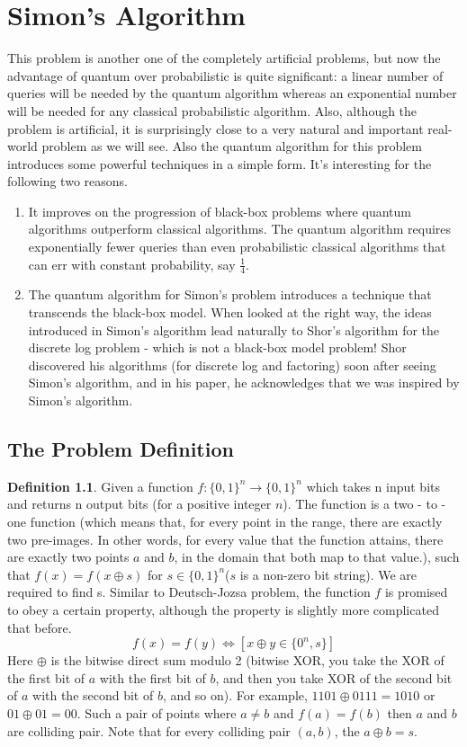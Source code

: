 \documentclass[12pt, oneside]{book}
\theoremstyle{definition}
\newtheorem{definition}{Definition}[section]
\theoremstyle{definition}
\theoremstyle{remark}
\begin{document}
\chapter{Simon's Algorithm}
This problem is another one of the completely artificial problems, but now the advantage of quantum over probabilistic is quite significant: a linear  number of queries will be needed by the quantum algorithm whereas an exponential number will be needed for any classical probabilistic algorithm. Also, although the problem is artificial, it is surprisingly close to a very natural and important real-world problem as we will see. Also the quantum algorithm for this problem introduces some powerful techniques in a simple form. It's interesting for the following two reasons.
\begin{enumerate}
    \item It improves on the progression of black-box problems where quantum algorithms outperform classical algorithms. The quantum algorithm requires exponentially fewer queries than even probabilistic classical algorithms that can err with constant probability, say $\frac{1}{4}$.
    \item The quantum algorithm for Simon's problem introduces a technique that transcends the black-box model. When looked at the right way, the ideas introduced in Simon's algorithm lead naturally to Shor's algorithm for the discrete log problem - which is not a black-box model problem! Shor discovered his algorithms (for discrete log and factoring) soon after seeing Simon's algorithm, and in his paper, he acknowledges that we was inspired by Simon's algorithm.
\end{enumerate}
\section{The Problem Definition}
\begin{definition}
    Given a function $f:\{0,1\}^n \rightarrow \{0,1\}^n$ which takes n input bits and returns n output bits (for a positive integer $n$).
    The function is a two - to - one function (which means that, for every point in the range, there are exactly two pre-images. In other words, for every value that the function attains, there are exactly two points $a$ and $b$, in the domain that both map to that value.), such that $f(x)=f(x\oplus s)$ for $s \in \{0,1\}^n$($s$ is a non-zero bit string).
    We are required to find s. Similar to Deutsch-Jozsa problem, the function $f$ is promised to obey a certain property, although the property is slightly more complicated that before.
    \[
    f(x)=f(y) \iff [x \oplus y \in \{0^n,s\}]
    \]
    Here $\oplus$ is the bitwise direct sum modulo 2 (bitwise XOR, you take the XOR of the first bit of $a$ with the first bit of $b$, and then you take XOR of the second bit of $a$ with the second bit of $b$, and so on). For example, $1101 \oplus 0111 = 1010$ or $01 \oplus 01=00$. Such a pair of points where $a\neq b$ and $f(a)=f(b)$ then $a$ and $b$ are colliding pair. Note that for every colliding pair $(a,b)$, the $a \oplus b=s$.
\end{definition}
\end{document}
